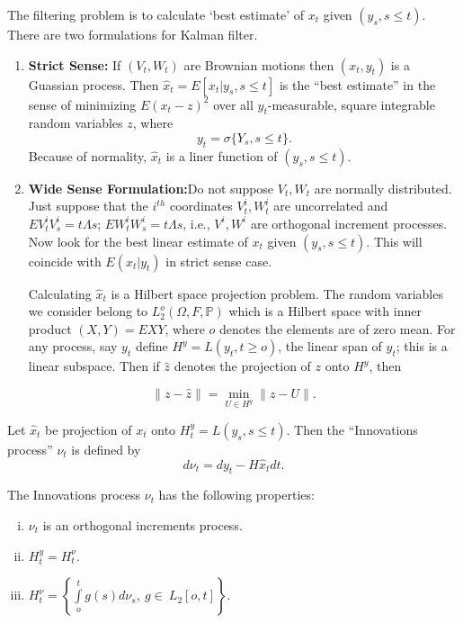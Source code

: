  The filtering problem is to calculate `best estimate' of $x_t$ given\break
 $(y_s, s \le t)$. There are two formulations for Kalman filter.  
\begin{enumerate}[{\bf (a)}]
\item \textbf{Strict Sense:} If $(V_t, W_t)$ are Brownian motions then
   $(x_t, y_t)$ is a Guassian process. Then $\hat{x}_t = E [x_t |y_s,
   s \le t]$ is the ``best estimate'' in the sense of minimizing $E
   (x_t - z)^2$ over all $y_t$-measurable, square integrable random
   variables $z$, where  
   $$
   y_t = \sigma \{Y_s, s \le t \}.
   $$
   Because of normality, $\hat{x}_t$ is a liner function of $(y_s, s
   \le t)$. 

 \item \textbf{Wide Sense Formulation:}\pageoriginale Do not suppose
   $V_t, W_t$ are 
   normally distributed. Just suppose that the $i^{th}$ coordinates
   $V^i_t, W^i_t$ are uncorrelated and $E V^i_t V^i_s = t \Lambda s$; $E
   W^i_t W^i_s = t \Lambda s$, i.e., $V^i, W^i$ are orthogonal increment
   processes. Now look for the best linear estimate of $x_t$ given
   $(y_s, s \le t)$. This will coincide with $E(x_t|y_t)$ in strict
   sense case. 

   Calculating $\hat{x}_t$ is a Hilbert space projection problem. The
   random variables we consider belong to $L^o_2 (\Omega, F,
   \mathbb{P})$ which is a Hilbert space with inner product $(X,Y) = E
   X  Y$, where $o$ denotes the elements are of zero mean. For any
   process, say $y_t$ define $H^y = L (y_t, t \ge o)$, the linear span
   of $y_t$; this is a linear subspace. Then if $\hat{z}$ denotes the
   projection of $z$ onto $H^y$, then  
 \end{enumerate} 
$$
\| z -\hat{z}\| = \min_{U \in  H^y}\|z -U\|.
$$
 
Let $\hat{x}_t$ be projection of $x_t$ onto $H^y_t = L (y_s, s \le
t)$. Then the ``Innovations process'' $\nu_t$ is defined by 
\begin{equation*}
  d \nu_t = dy_t - H \hat{x}_t dt. \tag{3}\label{part2:sec1:eq3}
\end{equation*} 
 
The Innovations process $\nu_t$ has the following properties:
 \begin{enumerate}[(i)]
 \item  $\nu_t$ is an orthogonal increments process.

 \item $H^y_t = H^{\nu}_t$.

 \item $H^\nu_t = \left\{ \int\limits_o^t  g (s) d \nu_s, ~g \in  ~
   L_2 [o,t]\right\}$. 
\end{enumerate}

